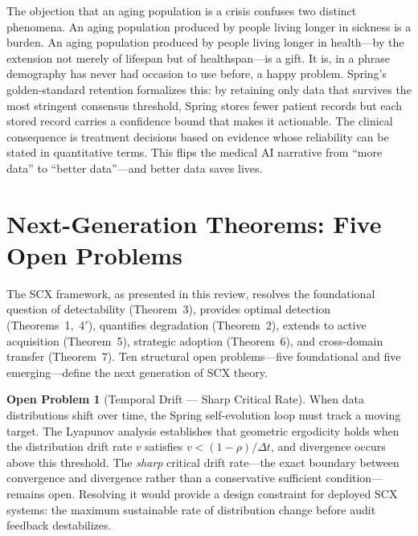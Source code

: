 \documentclass[twocolumn]{article}
\theoremstyle{definition}
\newtheorem{openproblem}{Open Problem}
\begin{document}
The objection that an aging population is a crisis confuses two distinct phenomena. An aging population produced by people living longer in sickness is a burden. An aging population produced by people living longer in health---by the extension not merely of lifespan but of healthspan---is a gift. It is, in a phrase demography has never had occasion to use before, a happy problem. Spring's golden-standard retention formalizes this: by retaining only data that survives the most stringent consensus threshold, Spring stores fewer patient records but each stored record carries a confidence bound that makes it actionable. The clinical consequence is treatment decisions based on evidence whose reliability can be stated in quantitative terms. This flips the medical AI narrative from ``more data'' to ``better data''---and better data saves lives.

\section{Next-Generation Theorems: Five Open Problems}
\label{sec:open}

The SCX framework, as presented in this review, resolves the foundational question of detectability (Theorem~3), provides optimal detection (Theorems~1,~4$'$), quantifies degradation (Theorem~2), extends to active acquisition (Theorem~5), strategic adoption (Theorem~6), and cross-domain transfer (Theorem~7). Ten structural open problems---five foundational and five emerging---define the next generation of SCX theory.

\begin{openproblem}[Temporal Drift — Sharp Critical Rate]
\label{prob:temporal}
When data distributions shift over time, the Spring self-evolution loop must track a moving target. The Lyapunov analysis establishes that geometric ergodicity holds when the distribution drift rate $v$ satisfies $v < (1-\rho)/\Delta t$, and divergence occurs above this threshold. The \emph{sharp} critical drift rate---the exact boundary between convergence and divergence rather than a conservative sufficient condition---remains open. Resolving it would provide a design constraint for deployed SCX systems: the maximum sustainable rate of distribution change before audit feedback destabilizes.
\end{openproblem}
\end{document}
